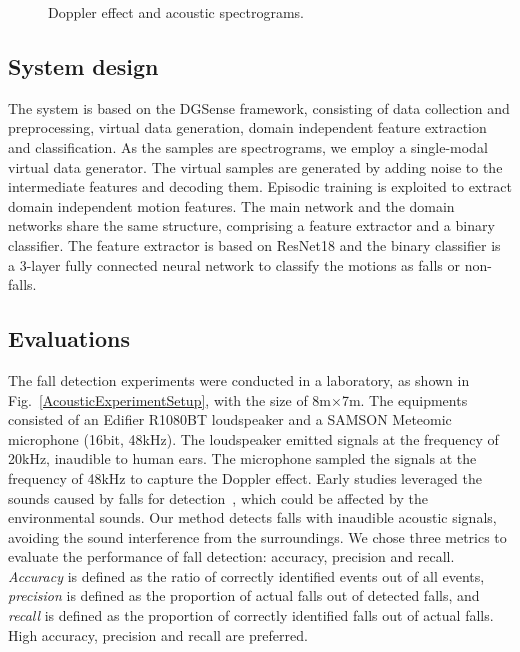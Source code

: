 \documentclass[journal]{IEEEtran}
\begin{document}
\begin{figure}
\begin{center}
\hspace{0.1cm}
\hspace{0.1cm}
\end{center}
\caption{Doppler effect and acoustic spectrograms.}
\label{FigAcousticSpectrogram}
\end{figure}

\subsection{System design}
The system is based on the DGSense framework, consisting of data collection and preprocessing, virtual data generation, domain independent feature extraction and classification. As the samples are spectrograms, we employ a single-modal virtual data generator. The virtual samples are generated by adding noise to the intermediate features and decoding them. Episodic training is exploited to extract domain independent motion features. The main network and the domain networks share the same structure, comprising a feature extractor and a binary classifier. The feature extractor is based on ResNet18 and the binary classifier is a 3-layer fully connected neural network to classify the motions as falls or non-falls.

\subsection{Evaluations}
The fall detection experiments were conducted in a laboratory, as shown in Fig.~\ref{AcousticExperimentSetup}, with the size of 8m$\times$7m. The equipments consisted of an Edifier R1080BT loudspeaker and a SAMSON Meteomic microphone (16bit, 48kHz). The loudspeaker emitted signals at the frequency of 20kHz, inaudible to human ears. The microphone sampled the signals at the frequency of 48kHz to capture the Doppler effect. Early studies leveraged the sounds caused by falls for detection~\cite{Khan:2015,Principi:2016}, which could be affected by the environmental sounds. Our method detects falls with inaudible acoustic signals, avoiding the sound interference from the surroundings.
%
We chose three metrics to evaluate the performance of fall detection: accuracy, precision and recall. \textit{Accuracy} is defined as the ratio of correctly identified events out of all events, \textit{precision} is defined as the proportion of actual falls out of detected falls, and \textit{recall} is defined as the proportion of correctly identified falls out of actual falls. High accuracy, precision and recall are preferred.  
\end{document}
